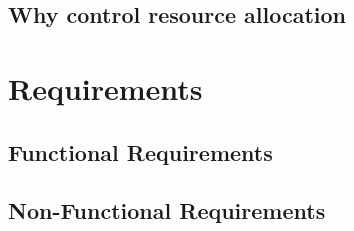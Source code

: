 \documentclass[a4paper]{article}
\begin{document}


\subsection{Why control resource allocation}

\section{Requirements}
\subsection{Functional Requirements}
\subsection{Non-Functional Requirements}
\end{document}
